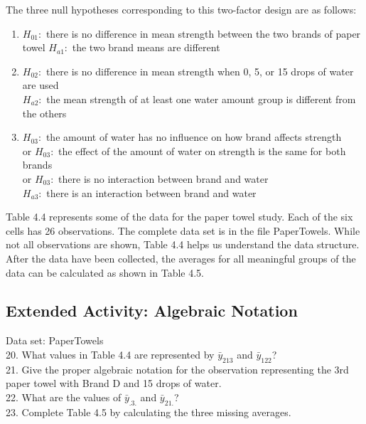 \documentclass[
]{report}
\begin{document}
The three null hypotheses corresponding to this two-factor design are as follows:

\begin{enumerate}
\def\labelenumi{\arabic{enumi}.}
\item
  \(H_{01}:\) there is no difference in mean strength between the two brands of paper towel
  \(H_{a1}:\) the two brand means are different
\item
  \(H_{02}:\) there is no difference in mean strength when 0, 5, or 15 drops of water are used\\
  \(H_{a2}:\) the mean strength of at least one water amount group is different from the others
\item
  \(H_{03}:\) the amount of water has no influence on how brand affects strength\\
  or \(H_{03}:\) the effect of the amount of water on strength is the same for both brands\\
  or \(H_{03}:\) there is no interaction between brand and water\\
  \(H_{a3}:\) there is an interaction between brand and water
\end{enumerate}

Table 4.4 represents some of the data for the paper towel study. Each of the six cells has 26 observations.
The complete data set is in the file PaperTowels. While not all observations are shown, Table 4.4 helps us
understand the data structure. After the data have been collected, the averages for all meaningful groups of
the data can be calculated as shown in Table 4.5.

\subsection{Extended Activity: Algebraic Notation}\label{extended-activity-algebraic-notation}

Data set: PaperTowels\\
20. What values in Table 4.4 are represented by \(\bar y_{213}\) and \(\bar y_{122}\)?\\
21. Give the proper algebraic notation for the observation representing the 3rd paper towel with Brand D and 15 drops of water.\\
22. What are the values of \(\bar y_{.3.}\) and \(\bar y_{21.}\)?\\
23. Complete Table 4.5 by calculating the three missing averages.
\end{document}
